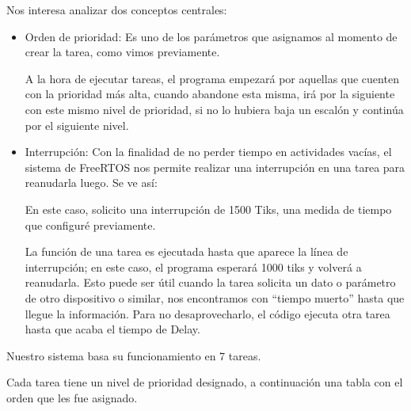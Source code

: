                     Nos interesa analizar dos conceptos centrales:\par
                    \begin{itemize} [label=•]
                        \setlength{\itemindent}{1.5em}
                        \item Orden de prioridad: Es uno de los parámetros que asignamos al momento de crear la tarea, como vimos previamente.\par
                        A la hora de ejecutar tareas, el programa empezará por aquellas que cuenten con la prioridad más alta, cuando abandone esta misma, irá por la siguiente con este mismo nivel de prioridad, si no lo hubiera baja un escalón y continúa por el siguiente nivel.\par
                        
                        \item Interrupción: Con la finalidad de no perder tiempo en actividades vacías, el sistema de FreeRTOS nos permite realizar una interrupción en una tarea para reanudarla luego. Se ve así:\par
                        
                        \par
                        
                        En este caso, solicito una interrupción de 1500 Tiks, una medida de tiempo que configuré previamente.\par
                        La función de una tarea es ejecutada hasta que aparece la línea de interrupción; en este caso, el programa esperará 1000 tiks y volverá a reanudarla. Esto puede ser útil cuando la tarea solicita un dato o parámetro de otro dispositivo o similar, nos encontramos con “tiempo muerto” hasta que llegue la información. Para no desaprovecharlo, el código ejecuta otra tarea hasta que acaba el tiempo de Delay.\par
                        \end{itemize}
                    
                    Nuestro sistema basa su funcionamiento en 7 tareas.\par

                    
                    
                    Cada tarea tiene un nivel de prioridad designado, a continuación una tabla con el orden que les fue asignado.\par
                    
